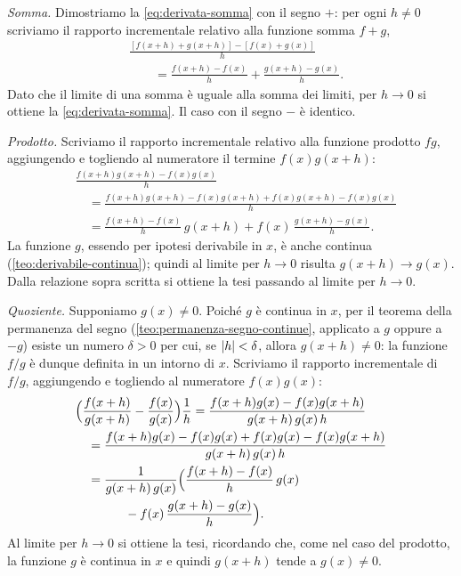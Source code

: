 \begin{dimostrazione}
\emph{Somma.} Dimostriamo la \eqref{eq:derivata-somma} con il segno $+$: per ogni
$h\neq0$ scriviamo il rapporto incrementale relativo alla funzione somma $f+g$,
\begin{equation}\label{eq:rapporto-somma}
\begin{split}
  &\frac{[f(x+h)+g(x+h)]-[f(x)+g(x)]}{h}\\
  &\qquad=\frac{f(x+h)-f(x)}{h}+\frac{g(x+h)-g(x)}{h}.
\end{split}
\end{equation}
Dato che il limite di una somma è uguale alla somma dei limiti, per $h\to0$ si ottiene la
\eqref{eq:derivata-somma}. Il caso con il segno $-$ è identico.

\emph{Prodotto.} Scriviamo il rapporto incrementale relativo alla funzione prodotto $fg$,
aggiungendo e togliendo al numeratore il termine $f(x)g(x+h)$:
\begin{equation}\label{eq:rapporto-prodotto}
\begin{split}
  &\frac{f(x+h)g(x+h)-f(x)g(x)}{h}\\
  &\quad=\frac{f(x+h)g(x+h)-f(x)g(x+h)+f(x)g(x+h)-f(x)g(x)}{h}\\
  &\quad=\frac{f(x+h)-f(x)}{h}\,g(x+h)+f(x)\,\frac{g(x+h)-g(x)}{h}.
\end{split}
\end{equation}
La funzione $g$, essendo per ipotesi derivabile in $x$, è anche continua
(\cref{teo:derivabile-continua}); quindi al limite per $h\to0$ risulta $g(x+h)\to g(x)$.
Dalla relazione sopra scritta si ottiene la tesi passando al limite per $h\to0$.

\emph{Quoziente.} Supponiamo $g(x)\neq0$. Poiché $g$ è continua in $x$, per il teorema
della permanenza del segno (\cref{teo:permanenza-segno-continue}, applicato a $g$ oppure
a $-g$) esiste un numero $\delta>0$ per cui, se $\lvert h\rvert<\delta$, allora $g(x+h)\neq0$:
la funzione $f/g$ è dunque definita in un intorno di $x$. Scriviamo il rapporto
incrementale di $f/g$, aggiungendo e togliendo al numeratore $f(x)g(x)$:
\begin{equation}\label{eq:rapporto-quoziente}
\begin{split}
  &\Bigl(\frac{f(x+h)}{g(x+h)}-\frac{f(x)}{g(x)}\Bigr)\frac1h
  =\frac{f(x+h)g(x)-f(x)g(x+h)}{g(x+h)\,g(x)\,h}\\
  &\quad=\frac{f(x+h)g(x)-f(x)g(x)+f(x)g(x)-f(x)g(x+h)}{g(x+h)\,g(x)\,h}\\
  &\quad=\frac1{g(x+h)\,g(x)}\Bigl(\frac{f(x+h)-f(x)}{h}\,g(x)\\
  &\qquad\qquad-f(x)\,\frac{g(x+h)-g(x)}{h}\Bigr).
\end{split}
\end{equation}
Al limite per $h\to0$ si ottiene la tesi, ricordando che, come nel caso del prodotto, la
funzione $g$ è continua in $x$ e quindi $g(x+h)$ tende a $g(x)\neq0$.
\end{dimostrazione}

